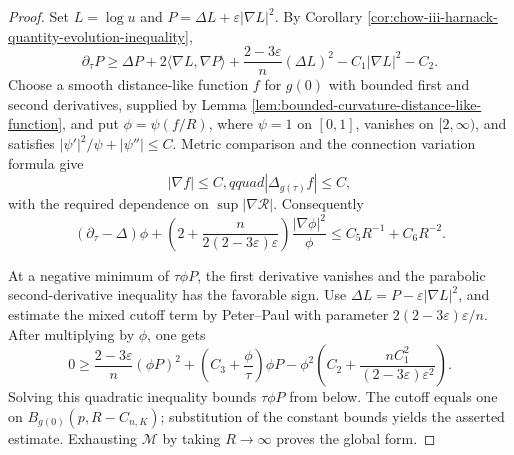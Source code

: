 \begin{proof}
\sketch Set \(L=\log u\) and
\(P=\Delta L+\varepsilon|\nabla L|^2\).  By Corollary
\ref{cor:chow-iii-harnack-quantity-evolution-inequality},
\[
 \partial_\tau P\geq\Delta P+2\langle\nabla L,\nabla P\rangle
 +\frac{2-3\varepsilon}{n}(\Delta L)^2-C_1|\nabla L|^2-C_2.
\]
Choose a smooth distance-like function \(f\) for \(g(0)\) with bounded first
and second derivatives, supplied by Lemma
\ref{lem:bounded-curvature-distance-like-function}, and put
\(\phi=\psi(f/R)\), where \(\psi=1\) on \([0,1]\), vanishes on
\([2,\infty)\), and satisfies
\(|\psi'|^2/\psi+|\psi''|\leq C\).  Metric comparison and the connection
variation formula give
\[
 |\nabla f|\leq C,qquad |\Delta_{g(\tau)}f|\leq C,
\]
with the required dependence on \(\sup|\nabla\mathcal R|\).  Consequently
\[
 (\partial_\tau-\Delta)\phi+
 \left(2+\frac{n}{2(2-3\varepsilon)\varepsilon}\right)
 \frac{|\nabla\phi|^2}{\phi}
 \leq C_5R^{-1}+C_6R^{-2}.
\]

At a negative minimum of \(\tau\phi P\), the first derivative vanishes and
the parabolic second-derivative inequality has the favorable sign.  Use
\(\Delta L=P-\varepsilon|\nabla L|^2\), and estimate the mixed cutoff term by
Peter--Paul with parameter
\(2(2-3\varepsilon)\varepsilon/n\).  After multiplying by \(\phi\), one gets
\[
 0\geq \frac{2-3\varepsilon}{n}(\phi P)^2
 +\left(C_3+\frac\phi\tau\right)\phi P
 -\phi^2\left(C_2+\frac{nC_1^2}
 {(2-3\varepsilon)\varepsilon^2}\right).
\]
Solving this quadratic inequality bounds \(\tau\phi P\) from below.
The cutoff equals one on \(B_{g(0)}(p,R-C_{n,K})\); substitution of the
constant bounds yields the asserted estimate.  Exhausting \(\mathcal M\)
by taking \(R\to\infty\) proves the global form.
\end{proof}


